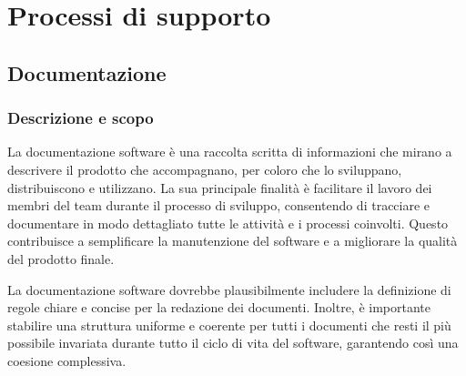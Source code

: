 \section{Processi di supporto}
\subsection{Documentazione}

\subsubsection{Descrizione e scopo} %

La documentazione software è una raccolta scritta di informazioni che mirano a descrivere il prodotto che accompagnano, per coloro che lo sviluppano, distribuiscono e utilizzano. La sua principale finalità è facilitare il lavoro dei membri del team durante il processo di sviluppo, consentendo di tracciare e documentare in modo dettagliato tutte le attività e i processi coinvolti. Questo contribuisce a semplificare la manutenzione del software e a migliorare la qualità del prodotto finale.

La documentazione software dovrebbe plausibilmente includere la definizione di regole chiare e concise per la redazione dei documenti. Inoltre, è importante stabilire una struttura uniforme e coerente per tutti i documenti che resti il più possibile invariata durante tutto il ciclo di vita del software, garantendo così una coesione complessiva.

